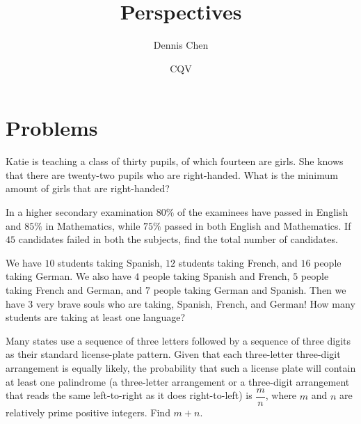 \documentclass{article}
\title{Perspectives}
\author{Dennis Chen}
\date{CQV}
\begin{document}
\maketitle



\pagebreak

\section{Problems}



     \begin{prob}[]{2}
Katie is teaching a class of thirty pupils, of which fourteen are girls. She knows that there are twenty-two pupils who are right-handed. What is the minimum amount of girls that are right-handed?
\end{prob}
    
     \begin{prob}[]{2}
In a higher secondary examination $80\%$ of the examinees have passed in English and $85\%$ in Mathematics, while $75\%$ passed in both English and Mathematics. If $45$ candidates failed in both the subjects, find the total number of candidates.
\end{prob}

     \begin{prob}[]{2}
We have $10$ students taking Spanish, $12$ students taking French, and $16$ people taking German. We also have $4$ people taking Spanish and French, $5$ people taking French and German, and $7$ people taking German and Spanish. Then we have $3$ very brave souls who are taking, Spanish, French, and German! How many students are taking at least one language?
\end{prob}
    
     \begin{prob}[AIME I 2002/1]{2}
Many states use a sequence of three letters followed by a sequence of three digits as their standard license-plate pattern. Given that each three-letter three-digit arrangement is equally likely, the probability that such a license plate will contain at least one palindrome (a three-letter arrangement or a three-digit arrangement that reads the same left-to-right as it does right-to-left) is $\dfrac{m}{n}$, where $m$ and $n$ are relatively prime positive integers. Find $m+n.$
\end{prob}
\end{document}
